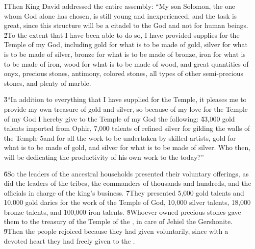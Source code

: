 \v{1}Then King David addressed the entire assembly: ``My son Solomon, the one whom God alone has chosen, is still young and inexperienced, and the task is great, since this structure will be a citadel to the  God and not for human beings. \v{2}To the extent that I have been able to do so, I have provided supplies for the Temple of my God, including gold for what is to be made of gold, silver for what is to be made of silver, bronze for what is to be made of bronze, iron for what is to be made of iron, wood for what is to be made of wood, and great quantities of onyx, precious stones, antimony, colored stones, all types of other semi-precious stones, and plenty of marble.

\v{3}``In addition to everything that I have supplied for the Temple, it pleases me to provide my own treasure of gold and silver, so because of my love for the Temple of my God I hereby give to the Temple of my God the following: \v{4}3,000 gold talents imported from Ophir, 7,000 talents of refined silver for gilding the walls of the Temple \v{5}and for all the work to be undertaken by skilled artists, gold for what is to be made of gold, and silver for what is to be made of silver. Who then, will be dedicating the productivity of his own work to the  today?''

\v{6}So the leaders of the ancestral households presented their voluntary offerings, as did the leaders of the tribes, the commanders of thousands and hundreds, and the officials in charge of the king's business. \v{7}They presented 5,000 gold talents and 10,000 gold darics for the work of the Temple of God, 10,000 silver talents, 18,000 bronze talents, and 100,000 iron talents. \v{8}Whoever owned precious stones gave them to the treasury of the Temple of the , in care of Jehiel the Gershonite. \v{9}Then the people rejoiced because they had given voluntarily, since with a devoted heart they had freely given to the .

